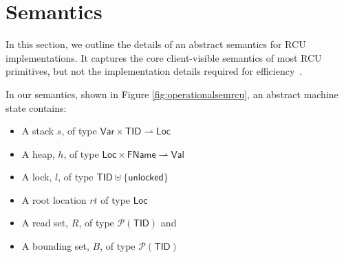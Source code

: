 \section{Semantics}
\label{sec:semantics}
In this section, we outline the details of an abstract semantics for RCU implementations. It captures the core client-visible semantics of most RCU primitives, but not the implementation details required for efficiency~\cite{Mckenney01read-copyupdate}.
\begin{comment}
\begin{figure}\scriptsize %
\grammar \meta
\caption{\texttt{Programming Language} for \textsf{RCU} programming.}
\label{fig:prog-lang}
\end{figure}\end{comment}
In our semantics, shown in Figure \ref{fig:operationalsemrcu}, an abstract machine state contains:\\

\begin{itemize}
\item A stack $s$, of type $\textsf{Var} \times \textsf{TID} \rightharpoonup \textsf{Loc}$
\item A heap, $h$, of type $\textsf{Loc} \times \textsf{FName} \rightharpoonup \textsf{Val}$
\item A lock, $l$, of type $\textsf{TID} \uplus \{\textsf{unlocked}\}$
\item A root location $rt$ of type $\textsf{Loc}$
\item A read set, $R$, of type $\mathcal{P}(\textsf{TID})$ and 
\item A bounding set, $B$, of type $\mathcal{P}(\textsf{TID})$ 
\end{itemize}

